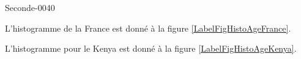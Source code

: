 
\begin{corrige}{Seconde-0040}

    L'histogramme de la France est donné à la figure \ref{LabelFigHistoAgeFrance}.
    \newcommand{\CaptionFigHistoAgeFrance}{Histogramme des âges en France pour l'exercice \ref{exoSeconde-0040}.}


L'histogramme pour le Kenya est donné à la figure \ref{LabelFigHistoAgeKenya}.
\newcommand{\CaptionFigHistoAgeKenya}{Histogramme des âges au Kenya pour l'exercices \ref{exoSeconde-0040}.}



\end{corrige}
